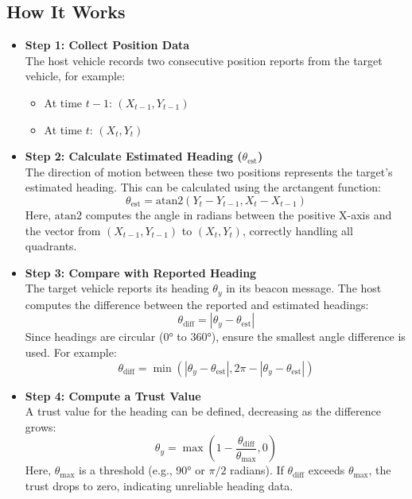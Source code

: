 \documentclass{article}
\begin{document}
\subsection*{How It Works}
\begin{itemize}
    \item \textbf{Step 1: Collect Position Data} \\
    The host vehicle records two consecutive position reports from the target vehicle, for example:
    \begin{itemize}
        \item At time \(t-1\): \((X_{t-1}, Y_{t-1})\)
        \item At time \(t\): \((X_t, Y_t)\)
    \end{itemize}

    \item \textbf{Step 2: Calculate Estimated Heading (\(\theta_{\text{est}}\))} \\
    The direction of motion between these two positions represents the target's estimated heading. This can be calculated using the arctangent function:
    \[
    \theta_{\text{est}} = \text{atan2}(Y_t - Y_{t-1}, X_t - X_{t-1})
    \]
    Here, \(\text{atan2}\) computes the angle in radians between the positive X-axis and the vector from \((X_{t-1}, Y_{t-1})\) to \((X_t, Y_t)\), correctly handling all quadrants.

    \item \textbf{Step 3: Compare with Reported Heading} \\
    The target vehicle reports its heading \(\theta_y\) in its beacon message. The host computes the difference between the reported and estimated headings:
    \[
    \theta_{\text{diff}} = |\theta_y - \theta_{\text{est}}|
    \]
    Since headings are circular (0° to 360°), ensure the smallest angle difference is used. For example:
    \[
    \theta_{\text{diff}} = \min(|\theta_y - \theta_{\text{est}}|, 2\pi - |\theta_y - \theta_{\text{est}}|)
    \]

    \item \textbf{Step 4: Compute a Trust Value} \\
    A trust value for the heading can be defined, decreasing as the difference grows:
    \[
    \theta_y = \max\left(1 - \frac{\theta_{\text{diff}}}{\theta_{\text{max}}}, 0\right)
    \]
    Here, \(\theta_{\text{max}}\) is a threshold (e.g., 90° or \(\pi/2\) radians). If \(\theta_{\text{diff}}\) exceeds \(\theta_{\text{max}}\), the trust drops to zero, indicating unreliable heading data.
\end{itemize}
\end{document}
